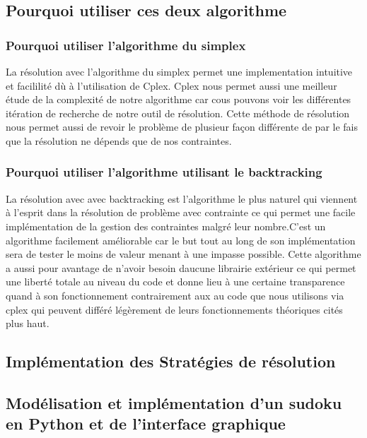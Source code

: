 \subsection{Pourquoi utiliser ces deux algorithme}

\subsubsection{Pourquoi utiliser l'algorithme du simplex}

La résolution avec l'algorithme du simplex permet une implementation intuitive et facililité dù à l'utilisation de Cplex. Cplex nous permet aussi une meilleur étude de la complexité de notre algorithme car cous pouvons voir les différentes itération de recherche de notre outil de résolution. Cette méthode de résolution nous permet aussi de revoir le problème de plusieur façon différente de par le fais que la résolution ne dépends que de nos contraintes.

\subsubsection{Pourquoi utiliser l'algorithme utilisant le backtracking}

La résolution avec avec backtracking est l'algorithme le plus naturel qui viennent à l'esprit dans la résolution de problème avec contrainte ce qui permet une facile implémentation de la gestion des contraintes malgré leur nombre.C'est un algorithme facilement améliorable car le but tout au long de son implémentation sera de tester le moins de valeur menant à une impasse possible. Cette algorithme a aussi pour avantage de n'avoir besoin daucune librairie extérieur ce qui permet une liberté totale au niveau du code et donne lieu à une certaine transparence quand à son fonctionnement contrairement aux au code que nous utilisons via cplex qui peuvent différé légèrement de leurs fonctionnements théoriques cités plus haut.

\subsection{Implémentation des Stratégies de résolution}

\subsection{Modélisation et implémentation d'un sudoku en Python et de l'interface graphique}


